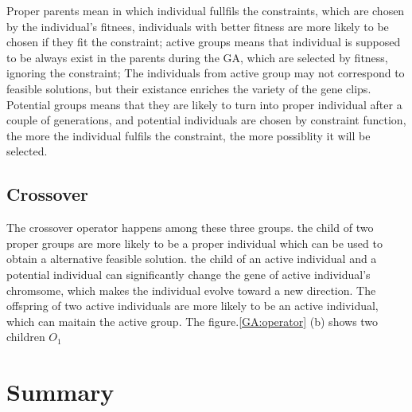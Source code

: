 Proper parents mean in which individual fullfils the constraints, which are
chosen by the individual's fitnees, individuals with better fitness are more
likely to be chosen if they fit the constraint; active groups means that
individual is supposed to be always exist in the parents during the GA, which
are selected by fitness, ignoring the constraint; The individuals from active
group may not correspond to feasible solutions, but their existance enriches the
variety of the gene clips.  Potential groups means that they are likely to turn
into proper individual after a couple of generations, and potential individuals
are chosen by constraint function, the more the individual fulfils the
constraint, the more possiblity it will be selected.

\subsection{Crossover}
The crossover operator happens among these three groups. the child of two proper
groups are more likely to be a proper individual which can be used to obtain a
alternative feasible solution. the child of an active individual and a potential
individual can significantly change the gene of active individual's chromsome,
which makes the individual evolve toward a new direction. The offspring of two
active individuals are more likely to be an active individual, which can maitain
the active group.  The figure.\ref{GA:operator} (b) shows two children $O_1$



\section{Summary}

